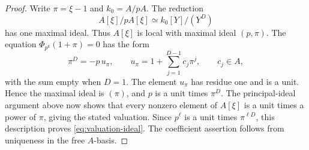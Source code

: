 \begin{proof}
Write \(\pi=\xi-1\) and \(k_0=A/pA\). The reduction
\[
 A[\xi]/pA[\xi]\simeq k_0[Y]/(Y^D)
\]
has one maximal ideal. Thus \(A[\xi]\) is local with maximal ideal
\((p,\pi)\). The equation \(\Phi_{p^k}(1+\pi)=0\) has the form
\[
 \pi^D=-p\,u_\pi,\qquad
 u_\pi=1+\sum_{j=1}^{D-1}c_j\pi^j,\qquad c_j\in A,
\]
with the sum empty when \(D=1\). The element \(u_\pi\) has residue
one and is a unit. Hence the maximal ideal is \((\pi)\), and \(p\)
is a unit times \(\pi^D\). The principal-ideal argument above now
shows that every nonzero element of \(A[\xi]\) is a unit times a power
of \(\pi\), giving the stated valuation. Since \(p^\ell\) is a unit
times \(\pi^{\ell D}\), this description proves
\eqref{eq:valuation-ideal}. The coefficient assertion follows from
uniqueness in the free \(A\)-basis.
\end{proof}
